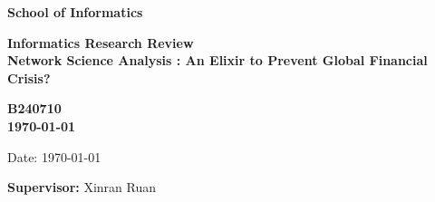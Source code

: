 \documentclass[a4paper,11pt]{article}
\newcommand{\examnumber}{B240710}
\newcommand{\field}{Network Science Analysis : An Elixir to Prevent Global Financial Crisis?}
\newcommand{\supervisor}{Xinran Ruan}
\begin{document}
\begin{minipage}[b]{110mm}
        {\Huge\bf School of Informatics
        \vspace*{17mm}}
\end{minipage}
\hfill
\begin{minipage}[t]{40mm}               
\end{minipage}
\par\noindent
\vspace*{2cm}
\begin{center}
        \Large\bf Informatics Research Review \\
        \Large\bf \field
\end{center}
\vspace*{1.5cm}
\begin{center}
        \bf \examnumber\\
        \monthyeardate\today
\end{center}
\vspace*{5mm}

%
%                       
\begin{abstract}
The emerging global financial system marked a new era where institutions, markets, and players are interconnected and depending on each other. Although it boosts global economic progress, it is exposed to systemic risk due to its properties. Network science is then proposed to manage such risk because its properties resemble real-world global financial systems. In this review, we explore the multiple usages of network science in global stock markets and draw context of usage, advantages, and disadvantages for each of the methods for future use cases.
\end{abstract}

\vspace*{1cm}

\vspace*{3cm}
Date: \today

\vfill
{\bf Supervisor:} \supervisor
\newpage

\setcounter{page}{1}                            %
\footruleheight{1pt}
\headruleheight{1pt}
\rhead{- \thepage}
\cfoot{}
%
\end{document}
